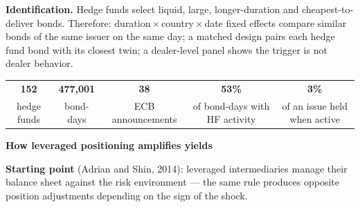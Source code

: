 \documentclass{article}
\newcommand{\fSect}{\fontsize{42}{50}\selectfont}
\newcommand{\fHead}{\fontsize{33}{42}\selectfont}
\newcommand{\fBody}{\fontsize{25}{33}\selectfont}
\newcommand{\fSmall}{\fontsize{21}{28}\selectfont}
\newcommand{\fStat}{\fontsize{44}{48}\selectfont}
\newcommand{\Section}[1]{%
  \vspace{6mm}
  {\fSect\bfseries\color{navy}#1\par}
  \vspace{2mm}{\color{navy}\rule{\textwidth}{1.5pt}}\par
  \vspace{5mm}}
\begin{document}
\vspace{7mm}
{\fBody\textbf{\color{navy}Identification.} Hedge funds select liquid, large, longer-duration and cheapest-to-deliver bonds. Therefore: duration\,$\times$\,country\,$\times$\,date fixed effects compare similar bonds of the same issuer on the same day; a matched design pairs each hedge fund bond with its closest twin; a dealer-level panel shows the trigger is not dealer behavior.\par}

\vspace{7mm}
\begin{center}
\begin{tabular}{c c c c c}
  {\fStat\bfseries\color{navy}152} & {\fStat\bfseries\color{navy}477{,}001} & {\fStat\bfseries\color{navy}38} & {\fStat\bfseries\color{navy}53\%} & {\fStat\bfseries\color{navy}3\%}\\[2.5mm]
  {\fSmall hedge funds} & {\fSmall bond-days} & {\fSmall ECB announcements} & {\fSmall of bond-days with HF activity} & {\fSmall of an issue held when active}\\
\end{tabular}
\end{center}

\Section{How leveraged positioning amplifies yields}

{\fBody\textbf{Starting point} (Adrian and Shin, 2014): leveraged intermediaries manage their balance sheet against the risk environment --- the same rule produces opposite position adjustments depending on the sign of the shock.\par}
\vspace{6mm}

\begin{center}
\end{center}
\end{document}
